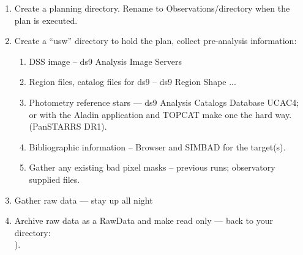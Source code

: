 \vspace{-.15cm}
\begin{enumerate}\addtolength{\itemsep}{-0.5\baselineskip}
   \item   Create a planning directory. Rename to Observations/directory
when the plan is executed.
   \item   Create a ``usw'' directory to hold the plan, collect pre-analysis information:
\vspace{-.15cm}
\begin{enumerate}\addtolength{\itemsep}{-0.5\baselineskip}
   \item   DSS image -- ds9 Analysis \menu Image Servers
   \item   Region files, catalog files for ds9 -- ds9 Region \menu Shape ...
   \item   Photometry reference stars --- ds9 Analysis \menu Catalogs \menu Database \menu UCAC4;
or with the Aladin application and TOPCAT make one the hard way. (PanSTARRS DR1).
   \item   Bibliographic information -- Browser and SIMBAD for the target(s).
   \item   Gather any existing bad pixel masks -- previous runs; observatory supplied files.
\end{enumerate}

   \item  Gather raw data --- stay up all night
   \item  Archive raw data as a RawData and make read only --- back to your {\color{verbcolor}{\verb#Observations#}} directory:\\
{\color{verbcolor}{\verb#(cd Observations/YYYYmmDD; mkdir -p RawData; cd RawData; rsync <from somewhere> .; chmod -w -R *#}}).
\end{enumerate}


